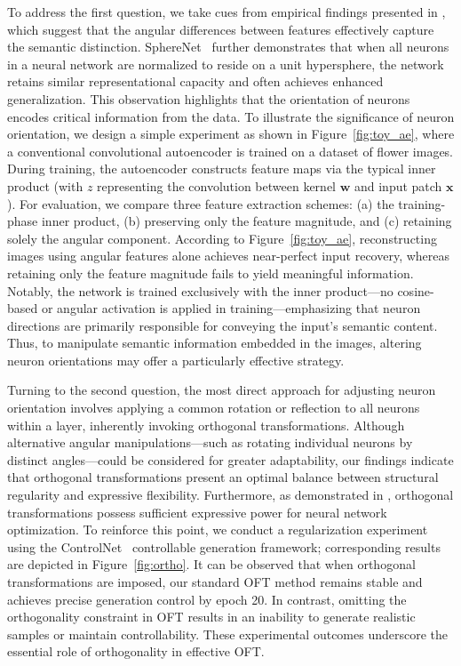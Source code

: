 To address the first question, we take cues from empirical findings presented in \cite{liu2018decoupled,chen2020angular}, which suggest that the angular differences between features effectively capture the semantic distinction. SphereNet~\cite{liu2017deep} further demonstrates that when all neurons in a neural network are normalized to reside on a unit hypersphere, the network retains similar representational capacity and often achieves enhanced generalization. This observation highlights that the orientation of neurons encodes critical information from the data. To illustrate the significance of neuron orientation, we design a simple experiment as shown in Figure~\ref{fig:toy_ae}, where a conventional convolutional autoencoder is trained on a dataset of flower images. During training, the autoencoder constructs feature maps via the typical inner product (with $z$ representing the convolution between kernel $\bm{w}$ and input patch $\bm{x}$). For evaluation, we compare three feature extraction schemes: (a) the training-phase inner product, (b) preserving only the feature magnitude, and (c) retaining solely the angular component. According to Figure~\ref{fig:toy_ae}, reconstructing images using angular features alone achieves near-perfect input recovery, whereas retaining only the feature magnitude fails to yield meaningful information. Notably, the network is trained exclusively with the inner product—no cosine-based or angular activation is applied in training—emphasizing that neuron directions are primarily responsible for conveying the input’s semantic content. Thus, to manipulate semantic information embedded in the images, altering neuron orientations may offer a particularly effective strategy.

Turning to the second question, the most direct approach for adjusting neuron orientation involves applying a common rotation or reflection to all neurons within a layer, inherently invoking orthogonal transformations. Although alternative angular manipulations—such as rotating individual neurons by distinct angles—could be considered for greater adaptability, our findings indicate that orthogonal transformations present an optimal balance between structural regularity and expressive flexibility. Furthermore, as demonstrated in \cite{liu2021orthogonal}, orthogonal transformations possess sufficient expressive power for neural network optimization. To reinforce this point, we conduct a regularization experiment using the ControlNet~\cite{zhang2023adding} controllable generation framework; corresponding results are depicted in Figure~\ref{fig:ortho}. It can be observed that when orthogonal transformations are imposed, our standard OFT method remains stable and achieves precise generation control by epoch 20. In contrast, omitting the orthogonality constraint in OFT results in an inability to generate realistic samples or maintain controllability. These experimental outcomes underscore the essential role of orthogonality in effective OFT.

